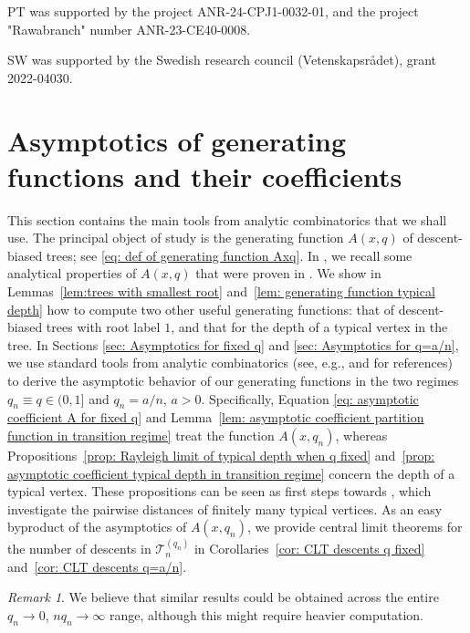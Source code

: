 \documentclass{article}
\theoremstyle{remark}
\newtheorem{remark}{Remark}
\newcommand{\cT}{\mathcal{T}}
\begin{document}
PT was supported by the project ANR-24-CPJ1-0032-01, and the project "Rawabranch" number ANR-23-CE40-0008.

SW was supported by the Swedish research council (Vetenskapsr{\aa}det), grant 2022-04030.

\section{Asymptotics of generating functions and their coefficients}
\label{sec:asymptotics}

This section contains the main tools from analytic combinatorics that we shall use.
The principal object of study is the generating function $A(x,q)$ of descent-biased trees; see \eqref{eq: def of generating function Axq}.
In , we recall some analytical properties of $A(x,q)$ that were proven in \cite{Thevenin_Wagner_2023}.
We show in Lemmas~\ref{lem:trees with smallest root} and~\ref{lem: generating function typical depth} how to compute two other useful generating functions:
that of descent-biased trees with root label $1$, and that for the depth of a typical vertex in the tree.
In Sections \ref{sec: Asymptotics for fixed q} and \ref{sec: Asymptotics for q=a/n}, we use standard tools from analytic combinatorics (see, e.g., \cite{Flajolet_Sedgewick_2009} and \cite[Corollary~2.16]{Drmota_2009} for references) to derive the asymptotic behavior of our generating functions in the two regimes $q_n \equiv q\in(0,1]$ and $q_n = a/n$, $a>0$.
Specifically, Equation \eqref{eq: asymptotic coefficient A for fixed q} and Lemma~\ref{lem: asymptotic coefficient partition function in transition regime} treat the function $A(x,q_n)$, whereas Propositions~\ref{prop: Rayleigh limit of typical depth when q fixed} and~\ref{prop: asymptotic coefficient typical depth in transition regime} concern the depth of a typical vertex.
These propositions can be seen as first steps towards , which investigate the pairwise distances of finitely many typical vertices.
As an easy byproduct of the asymptotics of $A(x,q_n)$, we provide central limit theorems for the number of descents in $\cT_n^{(q_n)}$ in Corollaries~\ref{cor: CLT descents q fixed} and~\ref{cor: CLT descents q=a/n}.

\begin{remark}
    We believe that similar results could be obtained across the entire $q_n \to0$, $nq_n\to\infty$ range, although this might require heavier computation.
\end{remark}
\end{document}
